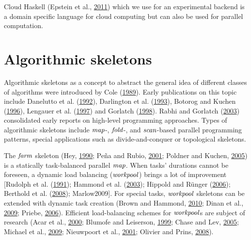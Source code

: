 \documentclass[paper=A4,twoside=true,openright,parskip=full,chapterprefix=true,headings=normal,bibliography=totoc,listof=totoc,titlepage=on,captions=tableabove,draft=false,british]{scrreprt}%
\begin{document}
Cloud Haskell (Epstein et al.,
\protect\hyperlink{ref-Epstein:2011:THC:2096148.2034690}{2011}) which we
use for an experimental backend is a domain specific language for cloud
computing but can also be used for parallel computation.

\hypertarget{algorithmic-skeletons}{%
\section{Algorithmic skeletons}\label{algorithmic-skeletons}}

\label{sec:relWorkAlgorithmicSkels}

Algorithmic skeletons as a concept to abstract the general idea of
different classes of algorithms were introduced by Cole
(\protect\hyperlink{ref-Cole1989}{1989}). Early publications on this
topic include Danelutto et al.
(\protect\hyperlink{ref-DANELUTTO1992205}{1992}), Darlington et al.
(\protect\hyperlink{ref-darlington1993parallel}{1993}), Botorog and
Kuchen (\protect\hyperlink{ref-botorog1996efficient}{1996}), Lengauer et
al. (\protect\hyperlink{ref-Lengauer1997}{1997}) and Gorlatch
(\protect\hyperlink{ref-Gorlatch1998}{1998}). Rabhi and Gorlatch
(\protect\hyperlink{ref-SkeletonBook}{2003}) consolidated early reports
on high-level programming approaches. Types of algorithmic skeletons
include \ensuremath{\Varid{map}}-, \ensuremath{\Varid{fold}}-, and \ensuremath{\Varid{scan}}-based parallel programming patterns,
special applications such as divide-and-conquer or topological
skeletons.

The \ensuremath{\Varid{farm}} skeleton (Hey, \protect\hyperlink{ref-Hey1990185}{1990}; Peña
and Rubio, \protect\hyperlink{ref-Eden:PPDP01}{2001}; Poldner and
Kuchen, \protect\hyperlink{ref-Kuchen05}{2005}) is a statically
task-balanced parallel \ensuremath{\Varid{map}}. When tasks' durations cannot be foreseen,
a dynamic load balancing (\ensuremath{\Varid{workpool}}) brings a lot of improvement
{[}Rudolph et al.
(\protect\hyperlink{ref-Rudolph:1991:SLB:113379.113401}{1991}); Hammond
et al. (\protect\hyperlink{ref-doi:10.1142ux2fS0129626403001380}{2003});
Hippold and Rünger (\protect\hyperlink{ref-Hippold2006}{2006}); Berthold
et al. (\protect\hyperlink{ref-PADL08HMWS}{2008}); Marlow2009{]}. For
special tasks, \ensuremath{\Varid{workpool}} skeletons can be extended with dynamic task
creation (Brown and Hammond,
\protect\hyperlink{ref-brown2010ever}{2010}; Dinan et al.,
\protect\hyperlink{ref-Dinan:2009:SWS:1654059.1654113}{2009}; Priebe,
\protect\hyperlink{ref-WPEuropar06}{2006}). Efficient load-balancing
schemes for \ensuremath{\Varid{workpool}}s are subject of research (Acar et al.,
\protect\hyperlink{ref-Acar:2000:DLW:341800.341801}{2000}; Blumofe and
Leiserson, \protect\hyperlink{ref-Blumofe:1999:SMC:324133.324234}{1999};
Chase and Lev,
\protect\hyperlink{ref-Chase:2005:DCW:1073970.1073974}{2005}; Michael et
al., \protect\hyperlink{ref-Michael:2009:IWS:1594835.1504186}{2009};
Nieuwpoort et al.,
\protect\hyperlink{ref-vanNieuwpoort:2001:ELB:568014.379563}{2001};
Olivier and Prins, \protect\hyperlink{ref-4625841}{2008}).
\end{document}
